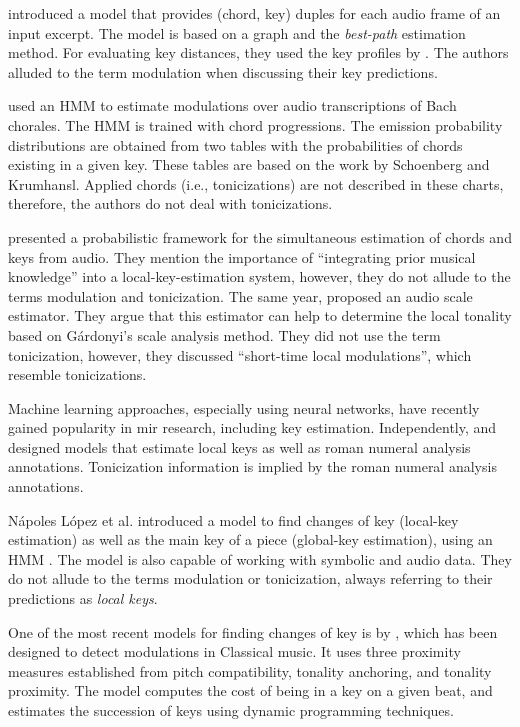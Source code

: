 \textcite{rocher2010concurrent} introduced a model that
provides (chord, key) duples for each audio frame of an
input excerpt. The model is based on a graph and the
\emph{best-path} estimation method. For evaluating key
distances, they used the key profiles by
\textcite{temperley1999whats}. The authors alluded to the
term modulation when discussing their key predictions.

\textcite{mearns2011automatically} used an HMM to estimate
modulations over audio transcriptions of Bach chorales. The
HMM is trained with chord progressions. The emission
probability distributions are obtained from two tables with
the probabilities of chords existing in a given key. These
tables are based on the work by Schoenberg and Krumhansl.
Applied chords (i.e., tonicizations) are not described in
these charts, therefore, the authors do not deal with
tonicizations.

\textcite{pauwels2014combining} presented a probabilistic
framework for the simultaneous estimation of chords and keys
from audio. They mention the importance of ``integrating
prior musical knowledge'' into a local-key-estimation
system, however, they do not allude to the terms modulation
and tonicization. The same year,
\textcite{weis2014chromabased} proposed an audio scale
estimator. They argue that this estimator can help to
determine the local tonality based on G\'{a}rdonyi's scale
analysis method. They did not use the term tonicization,
however, they discussed ``short-time local modulations'',
which resemble tonicizations.

Machine learning approaches, especially using neural
networks, have recently gained popularity in \gls{mir} research,
including key estimation. Independently,
\textcite{chen2018functional, chen2019harmony} and
\textcite{micchi2020not} designed models that estimate local
keys as well as roman numeral analysis annotations.
Tonicization information is implied by the roman numeral
analysis annotations.

N\'apoles L\'opez et al. introduced a model to find changes
of key (local-key estimation) as well as the main key of a
piece (global-key estimation), using an HMM
\textcite{napoleslopez2019keyfinding}. The model is also
capable of working with symbolic and audio data. They do not
allude to the terms modulation or tonicization, always
referring to their predictions as \emph{local keys}.

One of the most recent models for finding changes of key is
by \textcite{feisthauer2020estimating}, which has been
designed to detect modulations in Classical music. It uses
three proximity measures established from pitch
compatibility, tonality anchoring, and tonality proximity.
The model computes the cost of being in a key on a given
beat, and estimates the succession of keys using dynamic
programming techniques.
